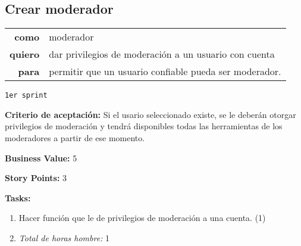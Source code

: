 \documentclass[hidelinks,a4paper,11pt, nofootinbib]{article}
\newcommand{\userstory}[3]{
\begin{tabular}{|r p{10cm}|}
  \hline
  \textbf{como} & #1 \\
  \textbf{quiero} & #2 \\
  \textbf{para} & #3 \\
  \hline
\end{tabular}

}
\newcommand{\critdeacep}[1]{\textbf{Criterio de aceptación:} #1

}
\newcommand{\busvalue}[1]{\textbf{Business Value:} #1

}
\newcommand{\storypoints}[1]{\textbf{Story Points:} #1

}
\newcommand{\primersprint}{\texttt{1er sprint}

}
\newcommand{\tasks}[1]{\textbf{Tasks:} 

#1}
\begin{document}
\subsection*{Crear moderador}
\userstory{moderador}{dar privilegios de moderación a un usuario con cuenta}{permitir que un usuario confiable pueda ser moderador.}
\primersprint
\critdeacep{Si el usario seleccionado existe, se le deberán otorgar privilegios de moderación y tendrá disponibles todas las herramientas de los moderadores a partir de ese momento.}
\busvalue{5}
\storypoints{3}
\tasks{
  \begin{enumerate}
    \item Hacer función que le de privilegios de moderación a una cuenta. (1)
    \item[] \textit{Total de horas hombre:} 1
  \end{enumerate}
}
\end{document}
